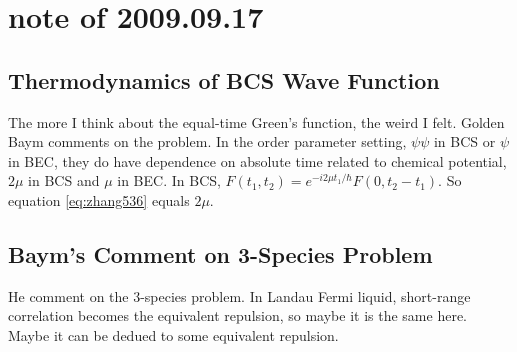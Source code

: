 \section{note of 2009.09.17}
\subsection{Thermodynamics of BCS Wave Function}
The more I think about the equal-time Green's function, the weird I felt. Golden Baym comments on the problem.  In the order parameter setting, $\psi\psi$ in BCS or $\psi$ in BEC, they do have dependence on absolute time related to chemical potential, $2\mu$ in BCS and $\mu$ in BEC.  In BCS, $F(t_1,t_2)=e^{-i2\mu{t_1}/\hbar}F(0,t_2-t_1)$. So equation \eqref{eq:zhang536} equals $2\mu$.  


\subsection{Baym's Comment on 3-Species Problem}
He comment on the 3-species problem.  In Landau Fermi liquid, short-range correlation becomes the equivalent repulsion, so maybe it is the same here.  Maybe it can be dedued to some equivalent repulsion.

